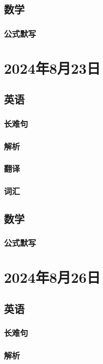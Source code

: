 \documentclass[UTF8]{ctexart}
\begin{document}
\subsection{数学}
\subsubsection{公式默写}
\begin{multicols}{2}
\end{multicols}
\section{2024年8月23日}
\subsection{英语}
\subsubsection{长难句}
\subsubsection{解析}
\subsubsection{翻译}
\subsubsection{词汇}
\subsection{数学}
\subsubsection{公式默写}
\begin{multicols}{2}
\end{multicols}
\section{2024年8月26日}
\subsection{英语}
\subsubsection{长难句}
\subsubsection{解析}
\end{document}
